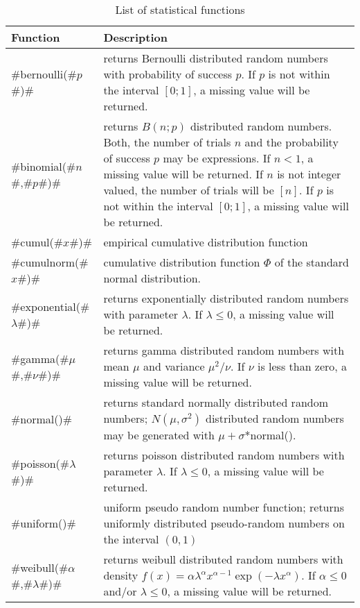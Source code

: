 \begin{table}[ht]
\begin{center}
\begin{tabular}{|l|p{11cm}|}
\hline
{\bf Function} & {\bf Description} \\
 \hline \hline
 #bernoulli(#$p$#)# & returns Bernoulli distributed
 random numbers with probability of success $p$. If $p$ is not
 within the interval $[0;1]$, a
 missing value will be returned. \\
 \hline
 #binomial(#$n$#,#$p$#)# & returns $B(n;p)$ distributed random
 numbers. Both, the number of trials $n$ and the probability of
 success $p$ may be expressions. If $n < 1$, a missing value will
 be returned. If $n$ is not integer valued, the number of trials
 will be $[n]$. If $p$ is not within the interval $[0;1]$, a
 missing value will be returned. \\
 \hline
 #cumul(#$x$#)# & empirical cumulative distribution function \\
 \hline
 #cumulnorm(#$x$#)# & cumulative distribution function $\Phi$ of the standard normal distribution. \\
 \hline
 #exponential(#$\lambda$#)# & returns exponentially distributed
 random numbers with parameter $\lambda$.
 If $\lambda \leq 0$, a missing value will be returned. \\
 \hline
 #gamma(#$\mu$#,#$\nu$#)# & returns gamma distributed random
 numbers with mean $\mu$ and variance $\mu^2/ \nu$.
 If $\nu$ is less than zero, a missing value will be returned.  \\
 \hline
 #normal()# & returns standard normally distributed random
 numbers;
 $N(\mu,\sigma^2)$ distributed random numbers may be generated with $\mu + \sigma$*normal(). \\
 \hline
 #poisson(#$\lambda$#)# & returns poisson distributed random
 numbers with parameter $\lambda$.  If $\lambda \leq 0$, a missing value will be returned.\\
 \hline
 #uniform()# & uniform
 pseudo random number function; returns uniformly distributed
 pseudo-random numbers on the interval $(0,1)$ \\
 \hline
 #weibull(#$\alpha$#,#$\lambda$#)# & returns weibull distributed
 random numbers with density
 $f(x)=\alpha\lambda^\alpha x^{\alpha-1}\exp(-\lambda x^\alpha)$.
 If $\alpha \leq 0$ and/or $\lambda \leq 0$, a missing value will be returned.\\
\hline
\end{tabular}
{\em \caption{\label{statfunc} List of statistical functions}}
\end{center}
\end{table}


